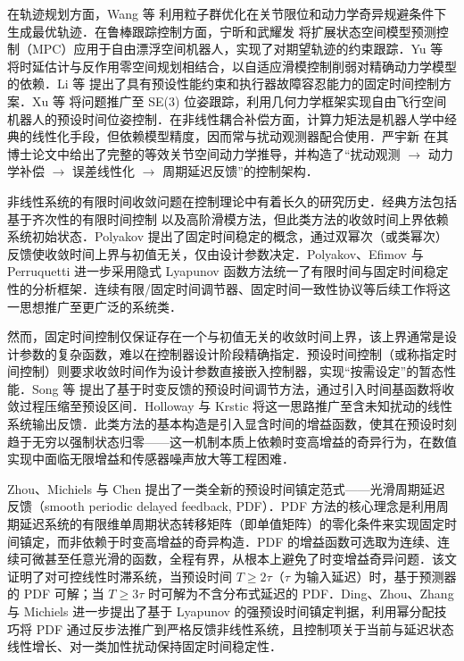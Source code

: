 \documentclass[12pt,a4paper]{article}
\theoremstyle{definition}
\theoremstyle{remark}
\begin{document}
在轨迹规划方面，Wang 等\cite{wang2015} 利用粒子群优化在关节限位和动力学奇异规避条件下生成最优轨迹．在鲁棒跟踪控制方面，宁昕和武耀发\cite{ning2019} 将扩展状态空间模型预测控制（MPC）应用于自由漂浮空间机器人，实现了对期望轨迹的约束跟踪．Yu 等\cite{yu2022} 将时延估计与反作用零空间规划相结合，以自适应滑模控制削弱对精确动力学模型的依赖．Li 等\cite{li2025} 提出了具有预设性能约束和执行器故障容忍能力的固定时间控制方案．Xu 等\cite{xu2024} 将问题推广至 SE(3) 位姿跟踪，利用几何力学框架实现自由飞行空间机器人的预设时间位姿控制．在非线性耦合补偿方面，计算力矩法是机器人学中经典的线性化手段\cite{krstic1995,spong2006}，但依赖模型精度，因而常与扰动观测器配合使用．严宇新\cite{yanyuxin2025} 在其博士论文中给出了完整的等效关节空间动力学推导，并构造了“扰动观测 $\to$ 动力学补偿 $\to$ 误差线性化 $\to$ 周期延迟反馈”的控制架构．


非线性系统的有限时间收敛问题在控制理论中有着长久的研究历史．经典方法包括基于齐次性的有限时间控制\cite{bhat2000} 以及高阶滑模方法\cite{levant2003}，但此类方法的收敛时间上界依赖系统初始状态．Polyakov\cite{polyakov2012} 提出了固定时间稳定的概念，通过双幂次（或类幂次）反馈使收敛时间上界与初值无关，仅由设计参数决定．Polyakov、Efimov 与 Perruquetti\cite{polyakov2015} 进一步采用隐式 Lyapunov 函数方法统一了有限时间与固定时间稳定性的分析框架．连续有限/固定时间调节器\cite{basin2017}、固定时间一致性协议等后续工作将这一思想推广至更广泛的系统类．

然而，固定时间控制仅保证存在一个与初值无关的收敛时间上界，该上界通常是设计参数的复杂函数，难以在控制器设计阶段精确指定．预设时间控制（或称指定时间控制）则要求收敛时间作为设计参数直接嵌入控制器，实现“按需设定”的暂态性能．Song 等\cite{song2017} 提出了基于时变反馈的预设时间调节方法，通过引入时间基函数将收敛过程压缩至预设区间．Holloway 与 Krstic\cite{holloway2019} 将这一思路推广至含未知扰动的线性系统输出反馈．此类方法的基本构造是引入显含时间的增益函数，使其在预设时刻趋于无穷以强制状态归零——这一机制本质上依赖时变高增益的奇异行为，在数值实现中面临无限增益和传感器噪声放大等工程困难．

Zhou、Michiels 与 Chen\cite{zhou2022} 提出了一类全新的预设时间镇定范式——光滑周期延迟反馈（smooth periodic delayed feedback, PDF）．PDF 方法的核心理念是利用周期延迟系统的有限维单周期状态转移矩阵（即单值矩阵）的零化条件来实现固定时间镇定，而非依赖于时变高增益的奇异构造．PDF 的增益函数可选取为连续、连续可微甚至任意光滑的函数，全程有界，从根本上避免了时变增益奇异问题．该文证明了对可控线性时滞系统，当预设时间 $T\ge 2\tau$（$\tau$ 为输入延迟）时，基于预测器的 PDF 可解；当 $T\ge 3\tau$ 时可解为不含分布式延迟的 PDF．Ding、Zhou、Zhang 与 Michiels\cite{ding2024} 进一步提出了基于 Lyapunov 的强预设时间镇定判据，利用幂分配技巧将 PDF 通过反步法推广到严格反馈非线性系统，且控制项关于当前与延迟状态线性增长、对一类加性扰动保持固定时间稳定性．
\end{document}
